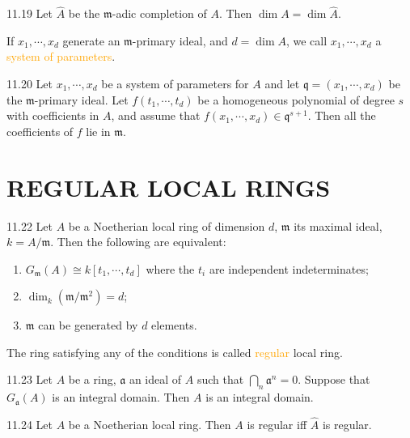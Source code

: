 \begin{corollary}{11.19}
	Let $\hat{A}$ be the $\mathfrak{m}$-adic completion of $A$. Then $\dim A=\dim\hat{A}$.
\end{corollary}

If $x_1,\cdots,x_d$ generate an $\mathfrak{m}$-primary ideal, and $d=\dim A$, we call $x_1,\cdots,x_d$ a \textcolor{orange}{system of parameters}.

\begin{proposition}{11.20}
	Let $x_1,\cdots,x_d$ be a system of parameters for $A$ and let $\mathfrak{q}=\left(x_1,\cdots,x_d\right)$ be the $\mathfrak{m}$-primary ideal. Let $f\left(t_1,\cdots,t_d\right)$ be a homogeneous polynomial of degree $s$ with coefficients in $A$, and assume that $f\left(x_1,\cdots,x_d\right)\in\mathfrak{q}^{s+1}$. Then all the coefficients of $f$ lie in $\mathfrak{m}$.
\end{proposition}

\section*{REGULAR LOCAL RINGS}

\begin{theorem}{11.22}
	Let $A$ be a Noetherian local ring of dimension $d$, $\mathfrak{m}$ its maximal ideal, $k=A/\mathfrak{m}$. Then the following are equivalent:
	\begin{enumerate}[label=\textup{(\roman*)}]
		\item $G_\mathfrak{m}(A)\cong k[t_1,\cdots,t_d]$ where the $t_i$ are independent indeterminates;
		\item $\dim_k\left(\mathfrak{m}/\mathfrak{m}^2\right)=d$;
		\item $\mathfrak{m}$ can be generated by $d$ elements.
	\end{enumerate}
	The ring satisfying any of the conditions is called \textcolor{orange}{regular} local ring.
\end{theorem}

\begin{proposition}{11.23}
	Let $A$ be a ring, $\mathfrak{a}$ an ideal of $A$ such that $\bigcap_n\mathfrak{a}^n=0$. Suppose that $G_\mathfrak{a}(A)$ is an integral domain. Then $A$ is an integral domain.
\end{proposition}

\begin{proposition}{11.24}
	Let $A$ be a Noetherian local ring. Then $A$ is regular iff $\hat{A}$ is regular.
\end{proposition}

